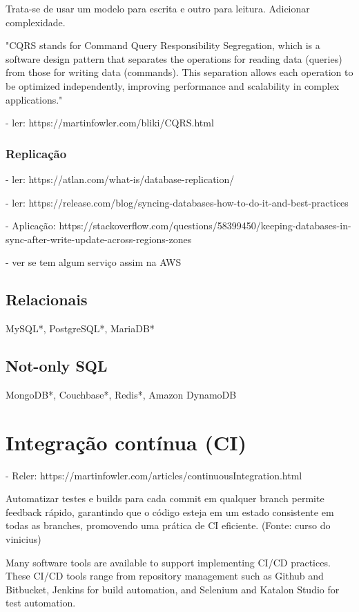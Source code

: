Trata-se de usar um modelo para escrita e outro para leitura. Adicionar complexidade. 

"CQRS stands for Command Query Responsibility Segregation, which is a software design pattern that separates the operations for reading data (queries) from those for writing data (commands). This separation allows each operation to be optimized independently, improving performance and scalability in complex applications."


- ler: https://martinfowler.com/bliki/CQRS.html


\subsubsection{Replicação}
- ler: https://atlan.com/what-is/database-replication/

- ler: https://release.com/blog/syncing-databases-how-to-do-it-and-best-practices

- Aplicação: https://stackoverflow.com/questions/58399450/keeping-databases-in-sync-after-write-update-across-regions-zones

- ver se tem algum serviço assim na AWS

\subsection{Relacionais}
MySQL*, PostgreSQL*, MariaDB*

\subsection{Not-only SQL}
MongoDB*, Couchbase*, Redis*, Amazon DynamoDB

\section{Integração contínua (CI)}

- Reler: https://martinfowler.com/articles/continuousIntegration.html

Automatizar testes e builds para cada commit em qualquer branch permite feedback rápido, garantindo que o código esteja em um estado consistente em todas as branches, promovendo uma prática de CI eficiente. (Fonte: curso do vinicius)

Many software tools are available to support implementing CI/CD practices. These CI/CD tools range from repository management such as Github and Bitbucket, Jenkins for build automation, and Selenium and Katalon Studio for test automation.

